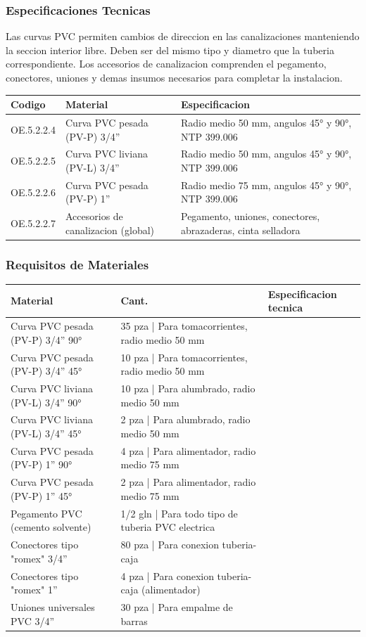 \subsubsection{Especificaciones Tecnicas}

Las curvas PVC permiten cambios de direccion en las canalizaciones manteniendo la seccion interior libre. Deben ser del mismo tipo y diametro que la tuberia correspondiente. Los accesorios de canalizacion comprenden el pegamento, conectores, uniones y demas insumos necesarios para completar la instalacion.

\begin{longtable}{L{5.0cm} L{3.0cm} L{6.5cm}}
\toprule
\textbf{Codigo} & \textbf{Material} & \textbf{Especificacion} \\
\midrule
OE.5.2.2.4 & Curva PVC pesada (PV-P) 3/4'' & Radio medio 50 mm, angulos 45° y 90°, NTP 399.006 \\
OE.5.2.2.5 & Curva PVC liviana (PV-L) 3/4'' & Radio medio 50 mm, angulos 45° y 90°, NTP 399.006 \\
OE.5.2.2.6 & Curva PVC pesada (PV-P) 1'' & Radio medio 75 mm, angulos 45° y 90°, NTP 399.006 \\
OE.5.2.2.7 & Accesorios de canalizacion (global) & Pegamento, uniones, conectores, abrazaderas, cinta selladora \\
\bottomrule
\end{longtable}

\subsubsection{Requisitos de Materiales}

\begin{longtable}{L{5.0cm} L{2.0cm} L{7.5cm}}
\toprule
\textbf{Material} & \textbf{Cant.} & \textbf{Especificacion tecnica} \\
\midrule
Curva PVC pesada (PV-P) 3/4'' 90° & 35 pza | Para tomacorrientes, radio medio 50 mm \\
Curva PVC pesada (PV-P) 3/4'' 45° & 10 pza | Para tomacorrientes, radio medio 50 mm \\
Curva PVC liviana (PV-L) 3/4'' 90° & 10 pza | Para alumbrado, radio medio 50 mm \\
Curva PVC liviana (PV-L) 3/4'' 45° & 2 pza | Para alumbrado, radio medio 50 mm \\
Curva PVC pesada (PV-P) 1'' 90° & 4 pza | Para alimentador, radio medio 75 mm \\
Curva PVC pesada (PV-P) 1'' 45° & 2 pza | Para alimentador, radio medio 75 mm \\
Pegamento PVC (cemento solvente) & 1/2 gln | Para todo tipo de tuberia PVC electrica \\
Conectores tipo "romex" 3/4'' & 80 pza | Para conexion tuberia-caja \\
Conectores tipo "romex" 1'' & 4 pza | Para conexion tuberia-caja (alimentador) \\
Uniones universales PVC 3/4'' & 30 pza | Para empalme de barras \\
\bottomrule
\end{longtable}

